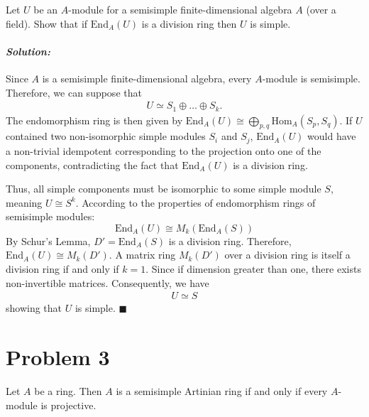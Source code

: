 \documentclass[12pt, a4paper]{article}
\theoremstyle{remark}
\newenvironment{solution}
  {\paragraph{\textit{Solution:}}\par\medskip}
  {\hfill$\blacksquare$\vspace{0.1cm}}
\begin{document}
Let $U$ be an $A$-module for a semisimple finite-dimensional algebra $A$ (over a field). Show that if $\text{End}_A(U)$ is a division ring then $U$ is simple.

\begin{solution}
   Since $A$ is a semisimple finite-dimensional algebra, every $A$-module is semisimple.
   Therefore, we can suppose that 
   \begin{align*}
    U \simeq   S_1 \oplus \dots \oplus S_k.
   \end{align*}
The endomorphism ring is then given by $\text{End}_A(U) \cong \bigoplus_{p, q} \text{Hom}_A(S_p, S_q)$. If $U$ contained two non-isomorphic simple modules $S_i$ and $S_j$, $\text{End}_A(U)$ would have a non-trivial idempotent corresponding to the projection onto one of the components, contradicting the fact that $\text{End}_A(U)$ is a division ring.

Thus, all simple components must be isomorphic to some simple module $S$, meaning $U \cong S^k$. According to the properties of endomorphism rings of semisimple modules:
\[ \text{End}_A(U) \cong M_k(\text{End}_A(S)) \]
By Schur's Lemma, $D' = \text{End}_A(S)$ is a division ring. Therefore, $\text{End}_A(U) \cong M_k(D')$. A matrix ring $M_k(D')$ over a division ring is itself a division ring if and only if $k = 1$. 
Since if dimension greater than one, there exists non-invertible matrices. Consequently, we have 
\begin{align*}
    U\simeq S 
\end{align*} 
showing that $U$ is simple.
\end{solution}

\section*{Problem 3}

Let $A$ be a ring. Then $A$ is a semisimple Artinian ring if and only if every $A$-module is projective.
\end{document}
